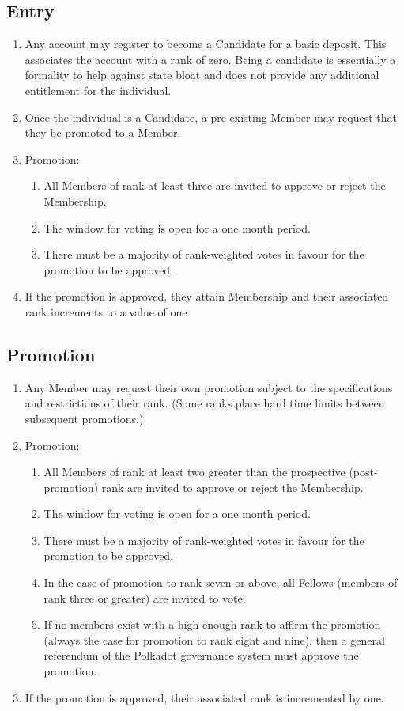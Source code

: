 \documentclass[9pt,oneside]{amsart}
\begin{document}
\subsection{Entry}

\begin{enumerate}
\item Any account may register to become a Candidate for a basic deposit. This associates the account with a rank of zero. Being a candidate is essentially a formality to help against state bloat and does not provide any additional entitlement for the individual.
\item Once the individual is a Candidate, a pre-existing Member may request that they be promoted to a Member.
\item Promotion:
  \begin{enumerate}
    \item All Members of rank at least three are invited to approve or reject the Membership.
    \item The window for voting is open for a one month period.
    \item There must be a majority of rank-weighted votes in favour for the promotion to be approved.
  \end{enumerate}
\item If the promotion is approved, they attain Membership and their associated rank increments to a value of one.
\end{enumerate}

\subsection{Promotion}

\begin{enumerate}
\item Any Member may request their own promotion subject to the specifications and restrictions of their rank. (Some ranks place hard time limits between subsequent promotions.)
\item Promotion:
  \begin{enumerate}
    \item All Members of rank at least two greater than the prospective (post-promotion) rank are invited to approve or reject the Membership.
    \item The window for voting is open for a one month period.
    \item There must be a majority of rank-weighted votes in favour for the promotion to be approved.
    \item In the case of promotion to rank seven or above, all Fellows (members of rank three or greater) are invited to vote.
    \item If no members exist with a high-enough rank to affirm the promotion (always the case for promotion to rank eight and nine), then a general referendum of the Polkadot governance system must approve the promotion.
  \end{enumerate}
\item If the promotion is approved, their associated rank is incremented by one.
\end{enumerate}
\end{document}
